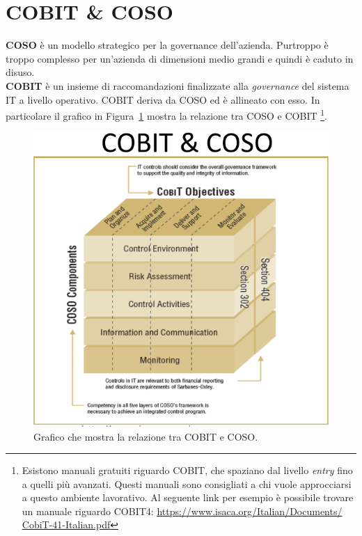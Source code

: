 \section{COBIT \& COSO}

\textbf{COSO} è un modello strategico per la governance dell'azienda. 
Purtroppo è troppo complesso per un'azienda di dimensioni medio grandi e 
quindi è caduto in disuso.\\
\newline
\textbf{COBIT} è un insieme di raccomandazioni finalizzate alla \textit{
governance} 
del sistema IT a livello operativo.
COBIT deriva da COSO ed è allineato con esso. In particolare il grafico in 
Figura~\ref{fig:cobit:coso:relazione} mostra la relazione tra COSO e COBIT
\footnote{Esistono manuali gratuiti 
riguardo COBIT, che spaziano dal livello \textit{entry} fino a quelli più 
avanzati. Questi manuali sono consigliati a chi vuole approcciarsi a questo 
ambiente lavorativo. Al seguente link per esempio è possibile trovare un 
manuale riguardo COBIT4:  \url{https://www.isaca.org/Italian/Documents/
CobiT-41-Italian.pdf}}.

\begin{figure}[h!]
        \begin{center}
                \includegraphics[scale=2.0]{res/img/cobit_coso_cube}
        \end{center}
        \caption{Grafico che mostra la relazione tra COBIT e COSO.}
        \label{fig:cobit:coso:relazione}
\end{figure}

